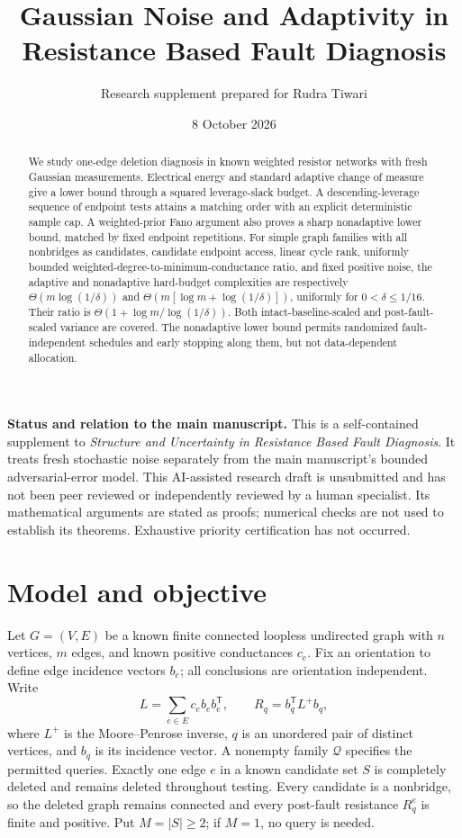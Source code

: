 \documentclass[11pt,letterpaper]{article}
\title{Gaussian Noise and Adaptivity in Resistance Based Fault Diagnosis}
\author{Research supplement prepared for Rudra Tiwari}
\date{8 October 2026}
\begin{document}
\maketitle
\begin{abstract}
We study one-edge deletion diagnosis in known weighted resistor networks with fresh Gaussian measurements. Electrical energy and standard adaptive change of measure give a lower bound through a squared leverage-slack budget. A descending-leverage sequence of endpoint tests attains a matching order with an explicit deterministic sample cap. A weighted-prior Fano argument also proves a sharp nonadaptive lower bound, matched by fixed endpoint repetitions. For simple graph families with all nonbridges as candidates, candidate endpoint access, linear cycle rank, uniformly bounded weighted-degree-to-minimum-conductance ratio, and fixed positive noise, the adaptive and nonadaptive hard-budget complexities are respectively $\Theta(m\log(1/\delta))$ and $\Theta(m[\log m+\log(1/\delta)])$, uniformly for $0<\delta\le1/16$. Their ratio is $\Theta(1+\log m/\log(1/\delta))$. Both intact-baseline-scaled and post-fault-scaled variance are covered. The nonadaptive lower bound permits randomized fault-independent schedules and early stopping along them, but not data-dependent allocation.
\end{abstract}

\noindent\textbf{Status and relation to the main manuscript.} This is a self-contained supplement to \emph{Structure and Uncertainty in Resistance Based Fault Diagnosis}. It treats fresh stochastic noise separately from the main manuscript's bounded adversarial-error model. This AI-assisted research draft is unsubmitted and has not been peer reviewed or independently reviewed by a human specialist. Its mathematical arguments are stated as proofs; numerical checks are not used to establish its theorems. Exhaustive priority certification has not occurred.

\section{Model and objective}\label{sec:model}
Let $G=(V,E)$ be a known finite connected loopless undirected graph with $n$ vertices, $m$ edges, and known positive conductances $c_e$. Fix an orientation to define edge incidence vectors $b_e$; all conclusions are orientation independent. Write
\[
 L=\sum_{e\in E}c_e b_e b_e^{\mathsf T},\qquad
 R_q=b_q^{\mathsf T}L^+b_q,
\]
where $L^+$ is the Moore--Penrose inverse, $q$ is an unordered pair of distinct vertices, and $b_q$ is its incidence vector. A nonempty family $\mathcal Q$ specifies the permitted queries. Exactly one edge $e$ in a known candidate set $S$ is completely deleted and remains deleted throughout testing. Every candidate is a nonbridge, so the deleted graph remains connected and every post-fault resistance $R_q^e$ is finite and positive. Put $M=|S|\ge2$; if $M=1$, no query is needed.
\end{document}

